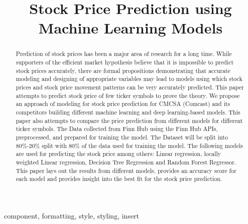 \documentclass[conference]{IEEEtran}
\begin{document}
\title{Stock Price Prediction using Machine Learning Models }

\author{
}

\maketitle

\begin{abstract}
Prediction of stock prices has been a major area of research for a long time.
While supporters of the efficient market hypothesis believe that it is impossible to predict stock prices accurately, there are formal propositions demonstrating that accurate modeling and designing of appropriate variables may lead to models using which stock prices and stock price movement patterns can be very accurately predicted.
This paper attempts to predict stock price of few ticker symbols to prove the theory.
We propose an approach of modeling for stock price prediction for CMCSA (Comcast) and its competitors building different machine learning and deep learning-based models.
This paper also attempts to compare the price prediction from different models for different ticker symbols.
The Data collected from Finn Hub using the Finn Hub APIs, preprocessed, and prepared for training the model.
The Dataset will be split into 80\%-20\% split with 80\% of the data used for training the model.
The following models are used for predicting the stock price among others: Linear regression, locally weighted Linear regression, Decision Tree Regression and Random Forest Regressor.
This paper lays out the results from different models, provides an accuracy score for each model and provides insight into the best fit for the stock price prediction.
\end{abstract}

\begin{IEEEkeywords}
component, formatting, style, styling, insert
\end{IEEEkeywords}
\end{document}
